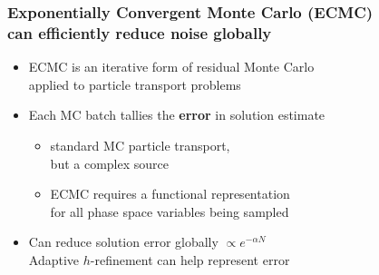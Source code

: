 \documentclass[xcolor=dvipsnames,hyperref={pdfpagelabels=false},unknownkeysallowed]{beamer}
\newcommand{\colb}[1]{{\color{blue} #1}}
\newcommand{\colG}[1]{{\color{Gray!110} #1}}
\newcommand{\colr}[1]{{\color{red} #1}}
\newlength{\wideitemsep}
\let\olditem\item
\renewcommand{\item}{\setlength{\itemsep}{\wideitemsep}\olditem}
\begin{document}
{\addtolength\leftmargini{-0.165in}
\begin{frame}
    \frametitle{Exponentially Convergent Monte Carlo (ECMC) \\ can efficiently reduce noise globally}
    \begin{itemize}
            \addtolength{\wideitemsep}{0.14in}
        \item[] ECMC is an iterative form of residual Monte Carlo
            \\ \colG{applied to particle transport problems}
        \item[] Each MC batch tallies the \textbf{error} in solution estimate
            \begin{itemize}
                \item \colG{standard MC particle transport,\\ but a \colr{complex} source}
                    \vspace{-0.21in}
                \item \colG{ECMC requires  a \colr{functional} representation \\ for all phase space variables being sampled}
    \end{itemize}

        \item[] Can reduce solution error \colb{globally} $\propto e^{-\alpha N}$ \\
            \colG{Adaptive $h$-refinement can help represent error}
     \end{itemize}
 \end{frame}
 }
\end{document}
